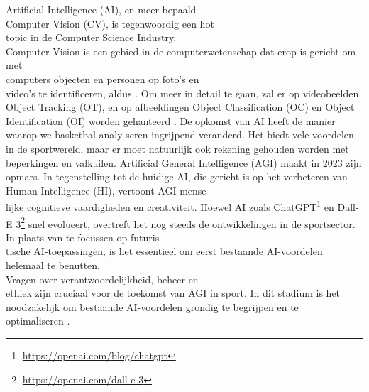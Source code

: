 



Artificial Intelligence (AI), en meer bepaald \\Computer Vision (CV), is tegenwoordig een hot \\topic in de Computer Science Industry. 
\\Computer Vision is een gebied in de computerwetenschap dat erop is gericht om met \\computers objecten en personen op foto's en \\video's te identificeren, aldus \textcite{R5}. Om meer in detail te gaan, zal er op videobeelden Object Tracking (OT), en op afbeeldingen Object Classification (OC) en Object Identification (OI) worden gehanteerd \autocite{R8}.
De opkomst van AI heeft de manier waarop we basketbal analy-seren ingrijpend veranderd. Het biedt vele voordelen in de sportwereld, maar er moet natuurlijk ook rekening gehouden worden met beperkingen en valkuilen. 
Artificial General Intelligence (AGI) maakt in 2023 zijn opmars. In tegenstelling tot de huidige AI, die gericht is op het verbeteren van Human Intelligence (HI), vertoont AGI mense-\\lijke cognitieve vaardigheden en creativiteit. Hoewel AI zoals ChatGPT\footnote{\url{https://openai.com/blog/chatgpt}} en Dall-E 3\footnote{\url{https://openai.com/dall-e-3}} snel evolueert, overtreft het nog steeds de ontwikkelingen in de sportsector. In plaats van te focussen op futuris-\\tische AI-toepassingen, is het essentieel om eerst bestaande AI-voordelen helemaal te benutten. \\Vragen over verantwoordelijkheid, beheer en \\ethiek zijn cruciaal voor de toekomst van AGI in sport. In dit stadium is het noodzakelijk om bestaande AI-voordelen grondig te begrijpen en te \\optimaliseren \autocite{R6}.


